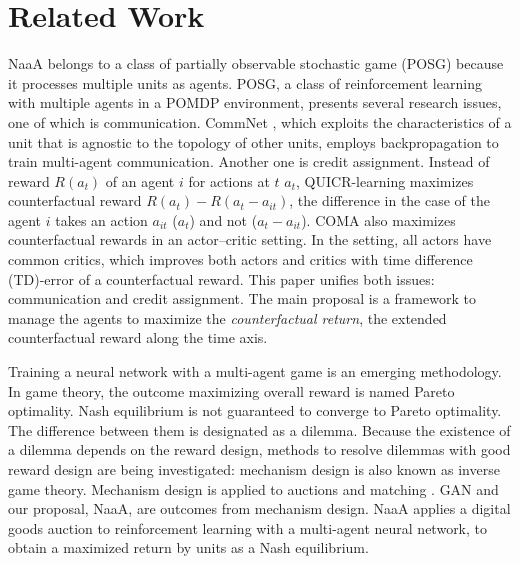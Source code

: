 \section{Related Work}
NaaA belongs to a class of partially observable stochastic game (POSG) \citep{hansen2004dynamic} because it processes multiple units as agents.
POSG, a class of reinforcement learning with multiple agents in a POMDP environment, presents several research issues, one of which is communication.
CommNet \citep{sukhbaatar2016learning}, which exploits the characteristics of a unit that is agnostic to the topology of other units, employs backpropagation to train multi-agent communication.
Another one is credit assignment.
Instead of reward $R(a_t)$ of an agent $i$ for actions at $t$ $a_t$, 
QUICR-learning \citep{agogino2006quicr} maximizes counterfactual reward $R(a_t) - R(a_t - a_{it})$, the difference in the case of the agent $i$ takes an action $a_{it}$ ($a_t$) and not ($a_t-a_{it}$).
COMA \citep{foerster2017counterfactual} also maximizes counterfactual rewards in an actor--critic setting.
In the setting, all actors have common critics, which improves both actors and critics with time difference (TD)-error of a counterfactual reward.
This paper unifies both issues: communication and credit assignment.
The main proposal is a framework to manage the agents to maximize the {\em counterfactual return}, the extended counterfactual reward along the time axis.

Training a neural network with a multi-agent game is an emerging methodology.
In game theory, the outcome maximizing overall reward is named Pareto optimality.
Nash equilibrium is not guaranteed to converge to Pareto optimality. The difference between them is designated as a dilemma.
Because the existence of a dilemma depends on the reward design, methods to resolve dilemmas with good reward design are being investigated: mechanism design \citep{myerson1983mechanism} is also known as inverse game theory.
Mechanism design is applied to auctions \citep{vickrey1961counterspeculation} and matching \citep{gale1962college}.
GAN and our proposal, NaaA, are outcomes from mechanism design.
NaaA applies a digital goods auction \citep{guruswami2005profit} to reinforcement learning with a multi-agent neural network, 
to obtain a maximized return by units as a Nash equilibrium.

